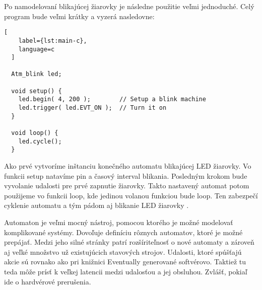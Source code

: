 \par Po namodelovaní blikajúcej žiarovky je následne použitie veľmi jednoduché. Celý program bude veľmi krátky a vyzerá nasledovne:
\begin{lstlisting}[
    label={lst:main-c},
    language=c
  ]

  Atm_blink led;

  void setup() {
    led.begin( 4, 200 );        // Setup a blink machine
    led.trigger( led.EVT_ON );  // Turn it on
  }
  
  void loop() {
    led.cycle();
  }
\end{lstlisting}
Ako prvé vytvoríme inštanciu konečného automatu blikajúcej LED žiarovky. Vo funkcii setup natavíme pin a časový interval blikania. Posledným krokom bude vyvolanie udalosti pre prvé zapnutie žiarovky. Takto nastavený automat potom použijeme vo funkcii loop, kde jedinou volanou funkciou bude loop. Ten zabezpečí cyklenie automatu a tým pádom aj blikanie LED žiarovky \cite{tinkerspyAutomaton2021}.
\par Automaton je veľmi mocný nástroj, pomocou ktorého je možné modelovať komplikované systémy.
Dovoľuje definíciu rôznych automatov, ktoré je možné prepájať. Medzi jeho silné stránky patrí rozšíriteľnosť o nové automaty a zároveň aj veľké množstvo už existujúcich stavových strojov.
Udalosti, ktoré spúšťajú akcie sú rovnako ako pri knižnici Eventually generované softvérovo.
Taktiež tu teda môže prísť k veľkej latencii medzi udalosťou a jej obsluhou. Zvlášť, pokiaľ ide o hardvérové prerušenia.